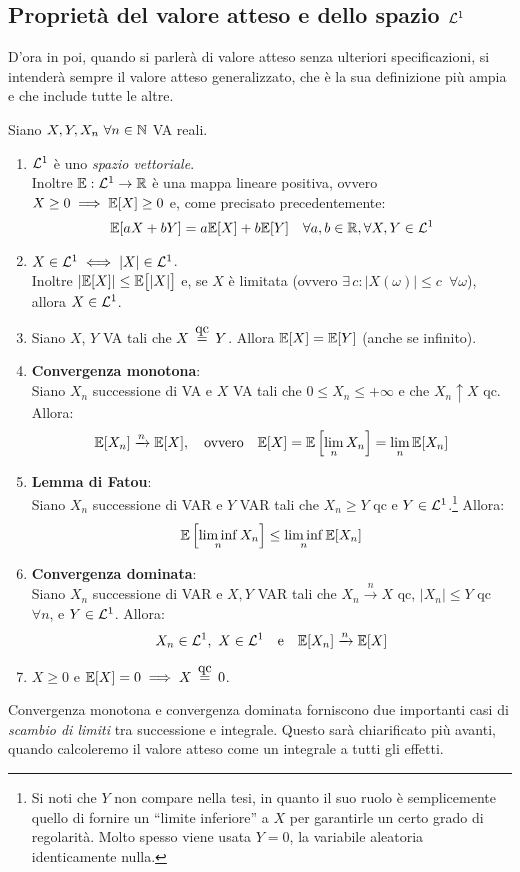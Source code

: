 \subsection{Proprietà del valore atteso e dello spazio $\mathcal L^1$}
D'ora in poi, quando si parlerà di valore atteso senza ulteriori specificazioni, si intenderà sempre il valore atteso generalizzato, che è la sua definizione più ampia e che include tutte le altre.
\begin{teob}[\JPTh{9.1}]\label{teoremone-l1-lim}
  Siano $X, Y, X_n \ \forall n \in \mathbb N$ VA reali.
  \begin{enumerate}
    \item $\mathcal L^1$ è uno \emph{spazio vettoriale}. \\
      Inoltre $\mathbb E: \mathcal L^1 \to \mathbb R$ è una mappa lineare positiva, ovvero $X \ge 0 \implies \mathbb E[X] \ge 0$ e, come precisato precedentemente:
      $$\mathbb E[aX+bY] = a\mathbb E[X] + b\mathbb E[Y] \quad \forall a,b \in \mathbb R, \forall X,Y \in \mathcal L^1$$
    \item $X \in \mathcal L^1 \iff \lvert X\rvert \in \mathcal L^1$. \\
      Inoltre $\lvert\mathbb E[X]\rvert \le \mathbb E\big[\lvert X\rvert\big]$ e, se $X$ è limitata
      (ovvero $\exists \, c: |X(\omega)| \le c \enspace \forall\omega$), allora $X \in \mathcal L^1$.
    \item Siano $X$, $Y$ VA tali che $X \aceq Y$. Allora $\mathbb E[X] = \mathbb E[Y]$ (anche se infinito).
    \item \textbf{Convergenza monotona}: \\
      Siano $X_n$ successione di VA e $X$ VA tali che $0 \le X_n \le +\infty$ e che $X_n \uparrow X$ qc. Allora:
      $$\mathbb E[X_n] \xrightarrow{n} \mathbb E[X], \quad \text{ovvero} \quad \mathbb E[X] = \mathbb E\left[\lim\limits_n{X_n}\right] = \lim\limits_n{\mathbb E[X_n]}$$
    \item \textbf{Lemma di Fatou}: \\
      Siano $X_n$ successione di VAR e $Y$ VAR tali che $X_n \ge Y$ qc e $Y \in \mathcal L^1$.\footnote{Si noti che $Y$ non compare nella tesi, in quanto il suo ruolo è semplicemente quello di fornire un ``limite inferiore'' a $X$ per garantirle un certo grado di regolarità. Molto spesso viene usata $Y = 0$, la variabile aleatoria identicamente nulla.}
      Allora:
      $$\mathbb E\left[\liminf\limits_n X_n\right]
        \le \liminf\limits_n \mathbb E[X_n]$$
    \item \textbf{Convergenza dominata}: \\
      Siano $X_n$ successione di VAR e $X, Y$ VAR tali che $X_n \xrightarrow{n} X$ qc, $|X_n| \le Y$ qc $\forall n$, e $Y \in \mathcal L^1$.
      Allora:
      $$X_n \in \mathcal L^1, \ X \in \mathcal L^1 \quad \text e \quad
      \mathbb E[X_n] \xrightarrow{n} \mathbb E[X]$$
      \item $X \geq 0$ e $\EE[X] = 0 \implies X \aceq 0$.
  \end{enumerate}
\end{teob}
Convergenza monotona e convergenza dominata forniscono due importanti casi di \emph{scambio di limiti} tra successione e integrale.
Questo sarà chiarificato più avanti, quando calcoleremo il valore atteso come un integrale a tutti gli effetti.

